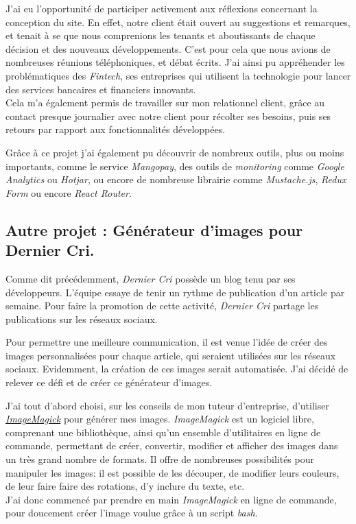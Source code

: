 \documentclass[12pt,a4paper]{article}
\begin{document}
  J'ai eu l'opportunité de participer activement aux réflexions concernant
  la conception du site. En effet, notre client était ouvert au
  suggestions et remarques, et tenait à se que nous comprenions les
  tenants et aboutissants de chaque décision et des nouveaux
  développements. C'est pour cela que nous avions de nombreuses réunions
  téléphoniques, et débat écrits. J'ai ainsi pu appréhender les
  problématiques des \emph{Fintech}, ses entreprises qui utilisent la
  technologie pour lancer des services bancaires et financiers
  innovants.\\
  Cela m'a également permis de travailler sur mon relationnel client,
  grâce au contact presque journalier avec notre client pour récolter ses
  besoins, puis ses retours par rapport aux fonctionnalités développées.

  \bigskip

  Grâce à ce projet j'ai également pu découvrir de nombreux outils, plus
  ou moins importants, comme le service \emph{Mangopay}, des outils de
  \emph{monitoring} comme \emph{Google Analytics} ou \emph{Hotjar}, ou
  encore de nombreuse librairie comme \emph{Mustache.js}, \emph{Redux
  Form} ou encore \emph{React Router}.

  \bigskip

  \subsection{Autre projet : Générateur d'images pour Dernier
  Cri.}\label{autre-projet-guxe9nuxe9rateur-dimages-pour-dernier-cri.}

  \bigskip

  Comme dit précédemment, \emph{Dernier Cri} possède un blog tenu par ses
  développeurs. L'équipe essaye de tenir un rythme de publication d'un
  article par semaine. Pour faire la promotion de cette activité,
  \emph{Dernier Cri} partage les publications sur les réseaux sociaux.

  \bigskip

  Pour permettre une meilleure communication, il est venue l'idée de créer
  des images personnalisées pour chaque article, qui seraient utilisées
  sur les réseaux sociaux. Evidemment, la création de ces images serait
  automatisée. J'ai décidé de relever ce défi et de créer ce générateur
  d'images.

  \bigskip

  J'ai tout d'abord choisi, sur les conseils de mon tuteur d'entreprise,
  d'utiliser
  \href{https://www.imagemagick.org/script/index.php}{\emph{ImageMagick}}
  pour générer mes images. \emph{ImageMagick} est un logiciel libre,
  comprenant une bibliothèque, ainsi qu'un ensemble d'utilitaires en ligne
  de commande, permettant de créer, convertir, modifier et afficher des
  images dans un très grand nombre de formats. Il offre de nombreuses
  possibilités pour manipuler les images: il est possible de les découper,
  de modifier leurs couleurs, de leur faire faire des rotations, d'y
  inclure du texte, etc.\\
  J'ai donc commencé par prendre en main \emph{ImageMagick} en ligne de
  commande, pour doucement créer l'image voulue grâce à un script
  \emph{bash}.
\end{document}
